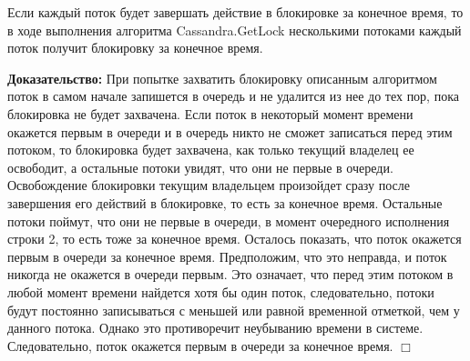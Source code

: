 \begin{theorem}
Если каждый поток будет завершать действие в блокировке за конечное время, то в ходе выполнения алгоритма Cassandra.GetLock несколькими потоками каждый поток получит блокировку за конечное время.
\end{theorem}
\textbf{Доказательство:}
При попытке захватить блокировку описанным алгоритмом поток в самом начале запишется в очередь и не удалится из нее до тех пор, пока блокировка не будет захвачена. Если поток в некоторый момент времени окажется первым в очереди и в очередь никто не сможет записаться перед этим потоком, то блокировка будет захвачена, как только текущий владелец ее освободит, а остальные потоки увидят, что они не первые в очереди. Освобождение блокировки текущим владельцем произойдет сразу после завершения его действий в блокировке, то есть за конечное время. Остальные потоки поймут, что они не первые в очереди, в момент очередного исполнения строки 2, то есть тоже за конечное время.
Осталось показать, что поток окажется первым в очереди за конечное время.
Предположим, что это неправда, и поток никогда не окажется в очереди первым. Это означает, что перед этим потоком в любой момент времени найдется хотя бы один поток, следовательно, потоки будут постоянно записываться с меньшей или равной временной отметкой, чем у данного потока. Однако это противоречит неубыванию времени в системе. Следовательно, поток окажется первым в очереди за конечное время.
$\Box$
